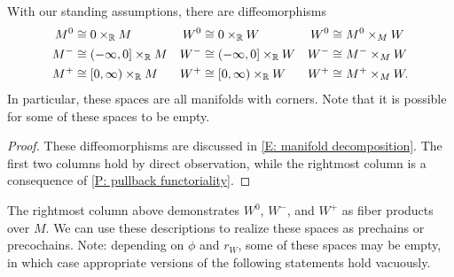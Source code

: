 \begin{lemma}\label{L: pm0 as fiber products}
	With our standing assumptions, there are diffeomorphisms
	\begin{align*}
		M^0 & \cong 0 \times_{\mathbb{R}} M &W^0 & \cong 0 \times_{\mathbb{R}} W & W^0& \cong M^0 \times_M W \\
		M^- & \cong (-\infty,0] \times_{\mathbb{R}} M &W^- & \cong (-\infty,0] \times_{\mathbb{R}} W& W^- &\cong M^- \times_M W\\
		M^+ & \cong [0,\infty) \times_{\mathbb{R}} M & W^+ & \cong [0,\infty) \times_{\mathbb{R}} W& W^+ &\cong M^+ \times_M W.
	\end{align*}
	In particular, these spaces are all manifolds with corners.
	Note that it is possible for some of these spaces to be empty.
\end{lemma}
\begin{proof}
	These diffeomorphisms are discussed in \cref{E: manifold decomposition}.
	The first two columns hold by direct observation, while the rightmost column is a consequence of \cref{P: pullback functoriality}.
\end{proof}

The rightmost column above demonstrates $W^0$, $W^-$, and $W^+$ as fiber products over $M$.
We can use these descriptions to realize these spaces as prechains or precochains.
Note: depending on $\phi$ and $r_W$, some of these spaces may be empty, in which case appropriate versions of the following statements hold vacuously.

